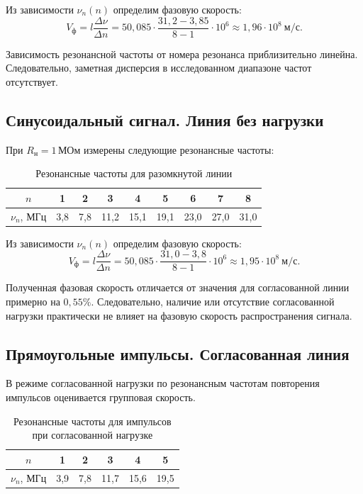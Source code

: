 \documentclass[a4paper,14pt]{extarticle}
\begin{document}
Из зависимости $\nu_n(n)$ определим фазовую скорость:
\begin{equation}
    V_{\text{ф}} = l\frac{\Delta \nu}{\Delta n}
    = 50{,}085 \cdot
    \frac{31{,}2 - 3{,}85}{8 - 1} \cdot 10^6
    \approx 1{,}96 \cdot 10^8 \ \text{м/с}.
\end{equation}

Зависимость резонансной частоты от номера резонанса
приблизительно линейна. Следовательно, заметная
дисперсия в исследованном диапазоне частот отсутствует.

\subsection{Синусоидальный сигнал. Линия без нагрузки}
При $R_{\text{н}}=1\,\text{МОм}$ измерены следующие резонансные частоты:

\begin{table}[H]
    \centering
    \caption{Резонансные частоты для разомкнутой линии}
    \begin{tabular}{ccccccccc}
        \toprule
        $n$ & 1 & 2 & 3 & 4 & 5 & 6 & 7 & 8\\
        \midrule
        $\nu_n$, МГц & 3,8 & 7,8 & 11,2 & 15,1 & 19,1 & 23,0 & 27,0 & 31,0\\
        \bottomrule
    \end{tabular}
\end{table}

Из зависимости $\nu_n(n)$ определим фазовую скорость:
\begin{equation}
    V_{\text{ф}} = l\frac{\Delta \nu}{\Delta n}
    = 50{,}085 \cdot
    \frac{31{,}0 - 3{,}8}{8 - 1} \cdot 10^6
    \approx 1{,}95 \cdot 10^8 \ \text{м/с}.
\end{equation}

Полученная фазовая скорость отличается от значения
для согласованной линии примерно на $0{,}55\%$.
Следовательно, наличие или отсутствие согласованной
нагрузки практически не влияет на фазовую скорость
распространения сигнала.

\subsection{Прямоугольные импульсы. Согласованная линия}
В режиме согласованной нагрузки по резонансным частотам повторения
импульсов оценивается групповая скорость.

\begin{table}[H]
    \centering
    \caption{Резонансные частоты для импульсов при согласованной нагрузке}
    \begin{tabular}{cccccc}
        \toprule
        $n$ & 1 & 2 & 3 & 4 & 5\\
        \midrule
        $\nu_n$, МГц & 3,9 & 7,8 & 11,7 & 15,6 & 19,5\\
        \bottomrule
    \end{tabular}
\end{table}
\end{document}

